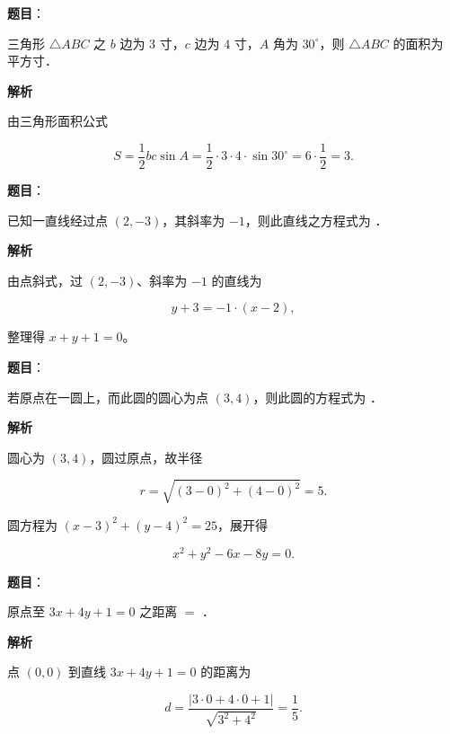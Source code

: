 \begin{answer}

\textbf{题目}：

三角形 $\triangle ABC$ 之 $b$ 边为 $3$ 寸，$c$ 边为 $4$ 寸，$A$ 角为 $30^\circ$，则 $\triangle ABC$ 的面积为 \gkblank{} \mbox{平方寸}．

\textbf{解析}

由三角形面积公式

\nopagebreak[4]
\[
S=\dfrac12bc\sin A=\dfrac12\cdot3\cdot4\cdot\sin30^\circ=6\cdot\dfrac12=3.
\]


\end{answer}
\begin{answer}

\textbf{题目}：

已知一直线经过点 $(2,-3)$，其斜率为 $-1$，则此直线之方程式为 \gkblank{}．

\textbf{解析}

由点斜式，过 $(2,-3)$、斜率为 $-1$ 的直线为

\nopagebreak[4]
\[
y+3=-1\cdot(x-2),
\]

整理得 $x+y+1=0$。


\end{answer}
\begin{answer}

\textbf{题目}：

若原点在一圆上，而此圆的圆心为点 $(3,4)$，则此圆的方程式为 \gkblank{}．

\textbf{解析}

圆心为 $(3,4)$，圆过原点，故半径

\nopagebreak[4]
\[
r=\sqrt{(3-0)^2+(4-0)^2}=5.
\]

圆方程为 $(x-3)^2+(y-4)^2=25$，展开得

\nopagebreak[4]
\[
x^2+y^2-6x-8y=0.
\]


\end{answer}
\begin{answer}

\textbf{题目}：

原点至 $3x+4y+1=0$ 之距离 $=$ \gkblank{}．

\textbf{解析}

点 $(0,0)$ 到直线 $3x+4y+1=0$ 的距离为

\nopagebreak[4]
\[
d=\dfrac{|3\cdot0+4\cdot0+1|}{\sqrt{3^2+4^2}}=\dfrac15.
\]


\end{answer}
